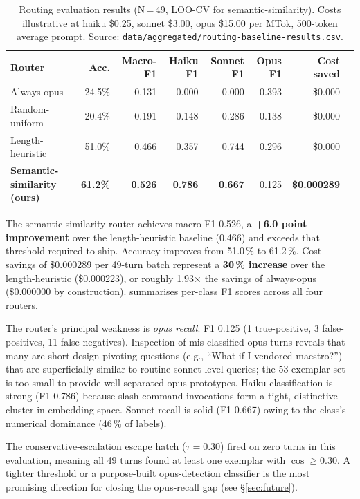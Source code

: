 \begin{table}[h]
\centering
\caption{Routing evaluation results (N\,=\,49, LOO-CV for semantic-similarity).
Costs illustrative at haiku \$0.25, sonnet \$3.00, opus \$15.00 per MTok,
500-token average prompt. Source: \texttt{data/aggregated/routing-baseline-results.csv}.}
\label{tab:routing-eval}
\begin{tabular}{lrrrrrrr}
\toprule
Router & Acc. & Macro-F1 & Haiku F1 & Sonnet F1 & Opus F1 & Cost saved \\
\midrule
Always-opus      & 24.5\% & 0.131 & 0.000 & 0.000 & 0.393 & \$0.000 \\
Random-uniform   & 20.4\% & 0.191 & 0.148 & 0.286 & 0.138 & \$0.000 \\
Length-heuristic & 51.0\% & 0.466 & 0.357 & 0.744 & 0.296 & \$0.000 \\
\textbf{Semantic-similarity (ours)} & \textbf{61.2\%} & \textbf{0.526} & \textbf{0.786} & \textbf{0.667} & 0.125 & \textbf{\$0.000289} \\
\bottomrule
\end{tabular}
\end{table}

The semantic-similarity router achieves macro-F1 0.526, a
\textbf{+6.0 point improvement} over the length-heuristic baseline (0.466)
and exceeds that threshold required to ship.
Accuracy improves from 51.0\,\% to 61.2\,\%.
Cost savings of \$0.000289 per 49-turn batch represent a \textbf{30\,\%
increase} over the length-heuristic (\$0.000223), or roughly 1.93\(\times\)
the savings of always-opus (\$0.000000 by construction).
 summarises per-class F1 scores across all four routers.



The router's principal weakness is \emph{opus recall}: F1 0.125
(1 true-positive, 3 false-positives, 11 false-negatives).
Inspection of mis-classified opus turns reveals that many are short
design-pivoting questions (e.g., ``What if I vendored maestro?'') that
are superficially similar to routine sonnet-level queries; the
53-exemplar set is too small to provide well-separated opus prototypes.
Haiku classification is strong (F1 0.786) because slash-command invocations
form a tight, distinctive cluster in embedding space.
Sonnet recall is solid (F1 0.667) owing to the class's numerical dominance
(46\,\% of labels).

The conservative-escalation escape hatch (\(\tau\!=\!0.30\)) fired on
zero turns in this evaluation, meaning all 49 turns found at least one
exemplar with $\cos\!\ge\!0.30$.
A tighter threshold or a purpose-built opus-detection classifier is the
most promising direction for closing the opus-recall gap (see
\S\ref{sec:future}).

